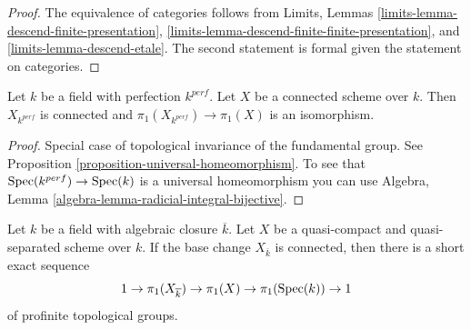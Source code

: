 \begin{proof}
The equivalence of categories follows from Limits, Lemmas
\ref{limits-lemma-descend-finite-presentation},
\ref{limits-lemma-descend-finite-finite-presentation}, and
\ref{limits-lemma-descend-etale}.
The second statement is formal given the statement on
categories.
\end{proof}

\begin{lemma}
\label{lemma-perfection}
Let $k$ be a field with perfection $k^{perf}$. Let $X$ be a connected scheme
over $k$. Then $X_{k^{perf}}$ is connected and
$\pi_1(X_{k^{perf}}) \to \pi_1(X)$ is an isomorphism.
\end{lemma}

\begin{proof}
Special case of topological invariance of the fundamental group.
See Proposition \ref{proposition-universal-homeomorphism}.
To see that $\mathop{\mathrm{Spec}}(k^{perf}) \to \mathop{\mathrm{Spec}}(k)$ is a universal
homeomorphism you can use
Algebra, Lemma \ref{algebra-lemma-radicial-integral-bijective}.
\end{proof}

\begin{lemma}
\label{lemma-ses-field}
Let $k$ be a field with algebraic closure $\overline{k}$.
Let $X$ be a quasi-compact and quasi-separated scheme over $k$.
If the base change $X_{\overline{k}}$ is connected, then
there is a short exact sequence
$$
1 \to \pi_1(X_{\overline{k}}) \to \pi_1(X) \to \pi_1(\mathop{\mathrm{Spec}}(k)) \to 1
$$
of profinite topological groups.
\end{lemma}

